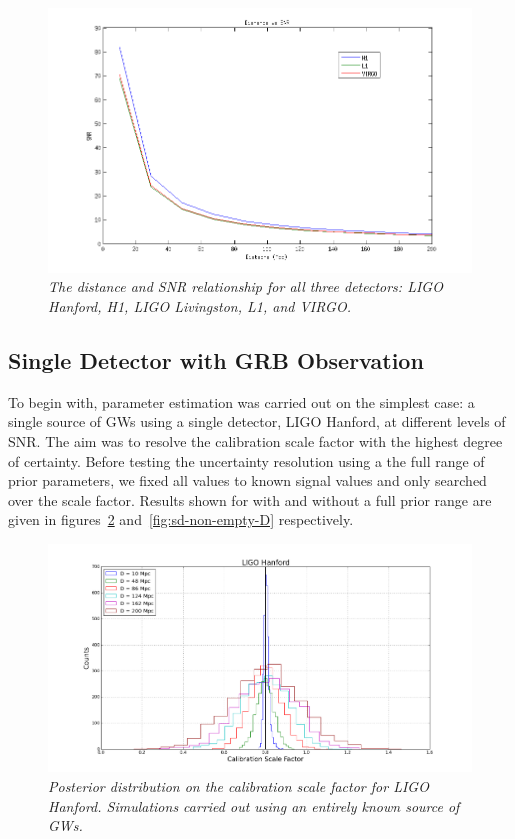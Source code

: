 \documentclass{jpconf}
\begin{document}
\begin{figure}[h]
  \centering
  \includegraphics[width = \textwidth]{DvsSNR-mult-det}
  \captionsetup{justification=centering}
  \caption{\textit{The distance and SNR relationship for all three detectors: LIGO Hanford, H1, LIGO Livingston, L1, and VIRGO.}}
  \label{fig:distsnr}
\end{figure}



\subsection{Single Detector with GRB Observation \label{sec:sdgrb}}


To begin with, parameter estimation was carried out on the simplest case: a single source of GWs using a single detector, LIGO Hanford, at different levels of SNR. The aim was to resolve the calibration scale factor with the highest degree of certainty. 
Before testing the uncertainty resolution using a the full range of prior parameters, we fixed all values to known signal values and only searched over the scale factor. Results shown for with and without a full prior range are given in figures~\ref{fig:sd-empty-D} and~\ref{fig:sd-non-empty-D} respectively.
 

\begin{figure}[h]
  \centering
  \includegraphics[width = \textwidth]{SD_empty_D10_200}
  \caption{\textit{Posterior distribution on the calibration scale factor for LIGO Hanford. Simulations carried out using an entirely known source of GWs.}}
  \label{fig:sd-empty-D}
\end{figure}
\end{document}
